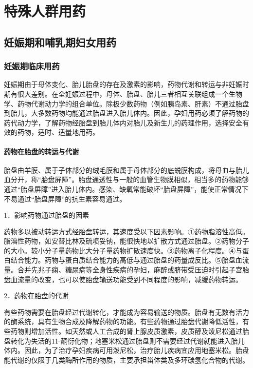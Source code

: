 \chapter{特殊人群用药}

\section{妊娠期和哺乳期妇女用药}

\subsection{妊娠期临床用药}

妊娠期由于母体变化、胎儿胎盘的存在及激素的影响，药物代谢和转运与非妊娠时期有很大差别。在全妊娠过程中，母体、胎盘、胎儿三者相互关联组成一个生物学、药物代谢动力学的组合单位。除极少数药物（例如胰岛素、肝素）不通过胎盘到胎儿，大多数药物均能通过胎盘进入胎儿体内。因此，孕妇用药必须了解药物的药代动力学，了解药物经胎盘到胎儿体内对胎儿及新生儿的药理作用，选择安全有效的药物，适时、适量地用药。

\subsubsection{药物在胎盘的转运与代谢}

胎盘由羊膜、属于子体部分的绒毛膜和属于母体部分的底蜕膜构成，将母血与胎儿血分开，称“胎盘屏障”。胎盘通透性与一般的血管生物膜相似，相当多的药物能够通过“胎盘屏障”进入胎儿体内。感染、缺氧常能破坏“胎盘屏障”，能使正常情况下不易通过“胎盘屏障”的抗生素容易通过。

1．影响药物通过胎盘的因素

药物多以被动转运方式经胎盘转运，其速度受以下因素影响。①药物脂溶性高低。脂溶性药物，如安替比林及硫喷妥钠，能很快地以扩散方式通过胎盘。②药物分子的大小。较小分子量药物比大分子量药物扩散速度快。③药物离子化程度。④与蛋白结合能力。药物与蛋白质结合能力的高低与通过胎盘的药量成反比。⑤胎盘血流量。合并先兆子痫、糖尿病等全身性疾病的孕妇，麻醉或脐带受压迫时引起子宫胎盘血流量的改变，也可以使胎盘输送功能受到不同程度的影响，减缓药物转运。

2．药物在胎盘的代谢

有些药物需要在胎盘经过代谢转化，才能成为容易输送的物质。胎盘有无数有活力的酶系统，具有生物合成及降解药物的功能。有些药物通过胎盘代谢降低活性，有些药物则增加活性。如天然或人工合成的肾上腺皮质激素，皮质醇及泼尼松通过胎盘转化为失活的11-酮衍化物；地塞米松通过胎盘则不需要经过代谢就能进入胎儿体内。因此，为了治疗孕妇疾病可用泼尼松，治疗胎儿疾病宜应用地塞米松。胎盘能代谢的仅限于几类酶所作用的物质，主要承担甾体类及多环碳氢化合物的代谢。

